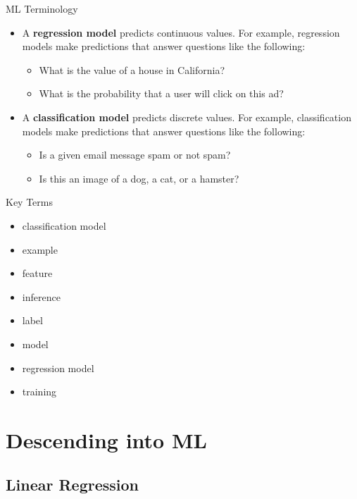 \documentclass{beamer}
\begin{document}
\begin{frame}{ML Terminology}
\begin{itemize}
    \item A {\bf regression model} predicts continuous values. For example, regression models make predictions that answer questions like the following:
    \begin{itemize}
        \item What is the value of a house in California?
        \item What is the probability that a user will click on this ad?
    \end{itemize}
    
    \item A {\bf classification model} predicts discrete values. For example, classification models make predictions that answer questions like the following:
    \begin{itemize}
        \item Is a given email message spam or not spam?
        \item Is this an image of a dog, a cat, or a hamster?
    \end{itemize}
\end{itemize}
\end{frame}

\begin{frame}{Key Terms}
\begin{itemize}
    \item classification model
    \item example
    \item feature
    \item inference
    \item label
    \item model
    \item regression model
    \item training
\end{itemize}
\end{frame}


\section{Descending into ML}

\subsection{Linear Regression}
\end{document}
